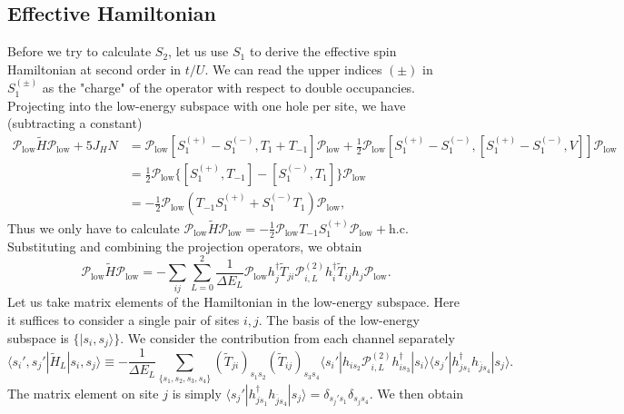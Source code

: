 \documentclass[11pt, a4paper]{article}
\begin{document}
\subsection{Effective Hamiltonian}
Before we try to calculate $S_2$, let us use $S_1$ to derive the effective spin Hamiltonian at second order in $t/U$. We can read the upper indices $(\pm)$ in $S_1^{(\pm)}$ as the "charge" of the operator with respect to double occupancies. Projecting into the low-energy subspace with one hole per site, we have (subtracting a constant)
\begin{align}
\mathcal{P}_{\text{low}} \tilde{H} \mathcal{P}_{\text{low}} + 5J_H N &= \mathcal{P}_{\text{low}} [S_1^{(+)} - S_1^{(-)}, T_1 + T_{-1}] \mathcal{P}_{\text{low}} + \frac{1}{2} \mathcal{P}_{\text{low}} [S_1^{(+)} - S_1^{(-)}, [S_1^{(+)} - S_1^{(-)}, V]] \mathcal{P}_{\text{low}} \nonumber \\
&= \frac{1}{2} \mathcal{P}_{\text{low}} \{[S_1^{(+)}, T_{-1}] - [S_1^{(-)}, T_1]\} \mathcal{P}_{\text{low}} \nonumber \\
&= -\frac{1}{2} \mathcal{P}_{\text{low}} (T_{-1} S_1^{(+)} + S_1^{(-)} T_1) \mathcal{P}_{\text{low}},
\end{align}
Thus we only have to calculate $\mathcal{P}_{\text{low}} \tilde{H} \mathcal{P}_{\text{low}} = -\frac{1}{2} \mathcal{P}_{\text{low}} T_{-1} S_1^{(+)} \mathcal{P}_{\text{low}} + \text{h.c.}$ Substituting and combining the projection operators, we obtain
\begin{equation}
\mathcal{P}_{\text{low}} \tilde{H} \mathcal{P}_{\text{low}} = -\sum_{ij} \sum_{L=0}^2 \frac{1}{\Delta E_L} \mathcal{P}_{\text{low}} h_j^{\dagger} \tilde{T}_{ji} \mathcal{P}_{i, L}^{(2)} h_i^{\dagger} \tilde{T}_{ij} h_j \mathcal{P}_{\text{low}}.
\end{equation}
Let us take matrix elements of the Hamiltonian in the low-energy subspace. Here it suffices to consider a single pair of sites $i, j$. The basis of the low-energy subspace is $\{|s_i, s_j\rangle\}$. We consider the contribution from each channel separately
\begin{equation}
\langle s_i', s_j' | \tilde{H}_L | s_i, s_j \rangle \equiv -\frac{1}{\Delta E_L} \sum_{\{s_1, s_2, s_3, s_4\}} (\tilde{T}_{ji})_{s_1 s_2} (\tilde{T}_{ij})_{s_3 s_4} \langle s_i' | h_{is_2} \mathcal{P}_{i,L}^{(2)} h_{is_3}^{\dagger} | s_i \rangle \langle s_j' | h_{js_1}^{\dagger} h_{\overline{j}s_4} | s_j \rangle.
\end{equation}
The matrix element on site $j$ is simply $\langle s_j' | h_{js_1}^{\dagger} h_{\overline{j}s_4} | s_j \rangle = \delta_{s_j' s_1} \delta_{s_j s_4}$. We then obtain
\end{document}
